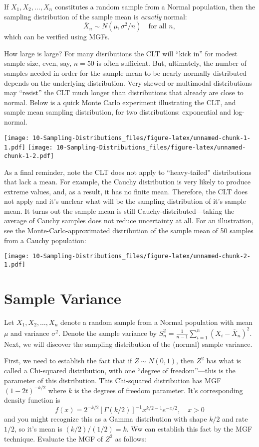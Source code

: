 \documentclass[
]{book}
\begin{document}
If \(X_1, X_2, \ldots, X_n\) constitutes a random sample from a Normal population, then the sampling distribution of the sample mean is \emph{exactly} normal:
\[\overline X_n \sim N(\mu, \sigma^2/n)\quad \text{for all }n,\]
which can be verified using MGFs.

How large is large? For many disributions the CLT will ``kick in'' for modest sample size, even, say, \(n=50\) is often sufficient. But, ultimately, the number of samples needed in order for the sample mean to be nearly normally distributed depends on the underlying distribution. Very skewed or multimodal distributions may ``resist'' the CLT much longer than distributions that already are close to normal. Below is a quick Monte Carlo experiment illustrating the CLT, and sample mean sampling distribution, for two distributions: exponential and log-normal.

\texttt{[image: 10-Sampling-Distributions\_files/figure-latex/unnamed-chunk-1-1.pdf]} \texttt{[image: 10-Sampling-Distributions\_files/figure-latex/unnamed-chunk-1-2.pdf]}

As a final reminder, note the CLT does not apply to ``heavy-tailed'' distributions that lack a mean. For example, the Cauchy distribution is very likely to produce extreme values, and, as a result, it has no finite mean. Therefore, the CLT does not apply and it's unclear what will be the sampling distribution of it's sample mean. It turns out the sample mean is still Cauchy-distributed---taking the average of Cauchy samples does not reduce uncertainty at all. For an illustration, see the Monte-Carlo-approximated distribution of the sample mean of 50 samples from a Cauchy population:

\texttt{[image: 10-Sampling-Distributions\_files/figure-latex/unnamed-chunk-2-1.pdf]}

\hypertarget{sample-variance}{%
\section{Sample Variance}\label{sample-variance}}

Let \(X_1, X_2, \ldots, X_n\) denote a random sample from a Normal population with mean \(\mu\) and variance \(\sigma^2\). Denote the sample variance by \(S^2_n = \frac{1}{n-1}\sum_{i=1}^n (X_i - \overline X_n)^2\). Next, we will discover the sampling distribution of the (normal) sample variance.

First, we need to establish the fact that if \(Z\sim N(0,1)\), then \(Z^2\) has what is called a Chi-squared distribution, with one ``degree of freedom''---this is the parameter of this distribution. This Chi-squared distribution has MGF \(\left(1-2t\right)^{-k/2}\) where \(k\) is the degrees of freedom parameter. It's corresponding density function is
\[f(x) = 2^{-k/2}\left[\Gamma(k/2)\right]^{-1}x^{k/2-1}e^{-x/2},\quad x>0\]
and you might recognize this as a Gamma distribution with shape \(k/2\) and rate \(1/2\), so it's mean is \((k/2)/(1/2) = k\). Ww can establish this fact by the MGF technique. Evaluate the MGF of \(Z^2\) as follows:
\end{document}
